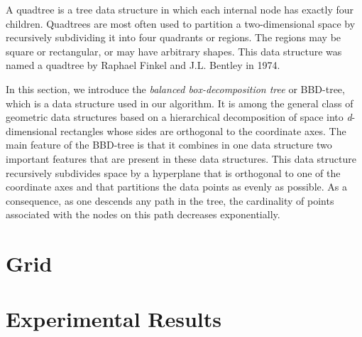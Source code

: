 \documentclass[ijoc,nonblindrev]{informs3} %
\begin{document}
A quadtree is a tree data structure in which each internal node has exactly four children. 
Quadtrees are most often used to partition a two-dimensional space by recursively 
subdividing it into four quadrants or regions. 
The regions may be square or rectangular, or may have arbitrary shapes. 
This data structure was named a quadtree by Raphael Finkel and J.L. Bentley in 1974. 

In this section, we introduce the \textit{balanced box-decomposition tree} or BBD-tree,
which is a data structure used in our algorithm. 
It is among the general class of geometric data structures based on a hierarchical decomposition of space
into \textit{d}-dimensional rectangles whose sides are orthogonal to the coordinate axes.
The main feature of the BBD-tree is that it combines in one data structure two
important features that are present in these data structures.
This data structure recursively subdivides space by a hyperplane that is orthogonal to one
of the coordinate axes and that partitions the data points as evenly as possible.
As a consequence, as one descends any path in the tree, the cardinality of points
associated with the nodes on this path decreases exponentially.

\section{Grid}


\section{Experimental Results}



%
%
%




\end{document}
